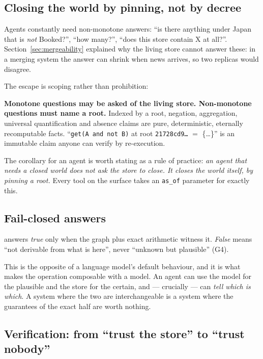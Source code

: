 \subsection{Closing the world by pinning, not by decree}
\label{sec:asof}

Agents constantly need non-monotone answers: ``is there anything under
\textsf{Japan} that is \emph{not} \textsf{Booked}?'', ``how many?'', ``does
this store contain X at all?''. Section~\ref{sec:mergeability} explained why
the living store cannot answer these: in a merging system the answer can
shrink when news arrives, so two replicas would disagree.

The escape is scoping rather than prohibition:

\begin{keyidea}
\textbf{Monotone questions may be asked of the living store. Non-monotone
questions must name a root.} Indexed by a root, negation, aggregation,
universal quantification and absence claims are pure, deterministic,
eternally recomputable facts. ``\texttt{get(A and not B)} at root
\texttt{21728cd9\ldots} $=$ \{\ldots\}'' is an immutable claim anyone can
verify by re-execution.
\end{keyidea}

The corollary for an agent is worth stating as a rule of practice: \emph{an
agent that needs a closed world does not ask the store to close. It closes the
world itself, by pinning a root.} Every tool on the surface takes an
\texttt{as\_of} parameter for exactly this.

\subsection{Fail-closed answers}

 answers \emph{true} only when the graph plus exact arithmetic
witness it. \emph{False} means ``not derivable from what is here'', never
``unknown but plausible'' (G4).

This is the opposite of a language model's default behaviour, and it is what
makes the operation composable with a model. An agent can use the model for
the plausible and the store for the certain, and --- crucially --- can
\emph{tell which is which}. A system where the two are interchangeable is a
system where the guarantees of the exact half are worth nothing.

\subsection{Verification: from ``trust the store'' to ``trust nobody''}
\label{sec:agents-verify}

